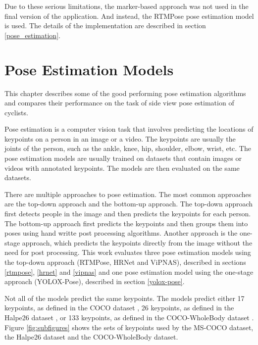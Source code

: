 Due to these serious limitations, the marker-based approach was not used in the final version of the application. And instead, the RTMPose pose estimation model is used. The details of the implementation are described in section \ref{pose_estimation}.




\chapter{Pose Estimation Models}
\label{ch:pose_estimation}

This chapter describes some of the good performing pose estimation algorithms and compares their performance on the task of side view pose estimation of cyclists.

Pose estimation is a computer vision task that involves predicting the locations of keypoints on a person in an image or a video. The keypoints are usually the joints of the person, such as the ankle, knee, hip, shoulder, elbow, wrist, etc. The pose estimation models are usually trained on datasets that contain images or videos with annotated keypoints. The models are then evaluated on the same datasets.

There are multiple approaches to pose estimation. The most common approaches are the top-down approach and the bottom-up approach. The top-down approach first detects people in the image and then predicts the keypoints for each person. The bottom-up approach first predicts the keypoints and then groups them into poses using hand writte post processing algorithms. Another approach is the one-stage approach, which predicts the keypoints directly from the image without the need for post processing. This work evaluates three pose estimation models using the top-down approach (RTMPose, HRNet and ViPNAS), described in sections \ref{rtmpose}, \ref{hrnet} and \ref{vipnas} and one pose estimation model using the one-stage approach (YOLOX-Pose), described in section \ref{yolox-pose}.

Not all of the models predict the same keypoints. The models predict either 17 keypoints, as defined in the COCO dataset \cite{coco}, 26 keypoints, as defined in the Halpe26 dataset \cite{halpe}, or 133 keypoints, as defined in the COCO-WholeBody dataset \cite{coco-wholebody}. Figure \ref{fig:subfigures} shows the sets of keypoints used by the MS-COCO dataset, the Halpe26 dataset and the COCO-WholeBody dataset.

